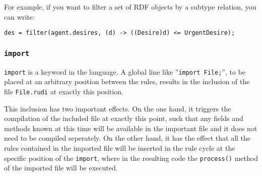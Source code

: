 For example, if you want to filter a set of RDF objects by a subtype relation, you can write:

\begin{lstlisting}
des = filter(agent.desires, (d) -> ((Desire)d) <= UrgentDesire);
\end{lstlisting}

\subsubsection{\texttt{import}}

%
\texttt{import} is a keyword in the \vonda language. A global line like ''\texttt{import File;}'', to be placed at an arbitrary position between the rules, results in the inclusion of the file \texttt{File.rudi} at exactly this position.

This inclusion has two important effects. On the one hand, it triggers the compilation of the included file at exactly this point, such that any fields and methods known at this time will be available in the important file and it does not need to be compiled seperately. On the other hand, it has the effect that all the rules contained in the imported file will be inserted in the rule cycle at the specific position of the \texttt{import}, where in the resulting code the \texttt{process()} method of the imported file will be executed.


